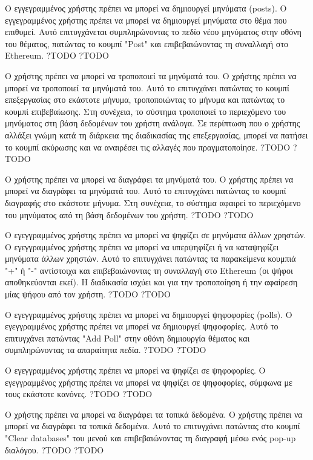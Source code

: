 \begin{enumerate}[label=\textbf{<ΛΑ-\arabic*>}, leftmargin=\parindent, align=left, labelwidth=\parindent, labelsep=0pt]
	\sysReqItem
		{Ο εγγεγραμμένος χρήστης πρέπει να μπορεί να δημιουργεί μηνύματα (posts).}
		{Ο εγγεγραμμένος χρήστης πρέπει να μπορεί να δημιουργεί μηνύματα στο θέμα που επιθυμεί. Αυτό επιτυγχάνεται συμπληρώνοντας το πεδίο νέου μηνύματος στην οθόνη του θέματος, πατώντας το κουμπί "Post" και επιβεβαιώνοντας τη συναλλαγή στο Ethereum.}
		{?}{TODO}
		{?}{TODO}

	\sysReqItem
		{Ο χρήστης πρέπει να μπορεί να τροποποιεί τα μηνύματά του.}
		{Ο χρήστης πρέπει να μπορεί να τροποποιεί τα μηνύματά του. Αυτό το επιτυγχάνει πατώντας το κουμπί επεξεργασίας στο εκάστοτε μήνυμα, τροποποιώντας το μήνυμα και πατώντας το κουμπί επιβεβαίωσης. Στη συνέχεια, το σύστημα τροποποιεί το περιεχόμενο του μηνύματος στη βάση δεδομένων του χρήστη ανάλογα. Σε περίπτωση που ο χρήστης αλλάξει γνώμη κατά τη διάρκεια της διαδικασίας της επεξεργασίας, μπορεί να πατήσει το κουμπί ακύρωσης και να αναιρέσει τις αλλαγές που πραγματοποίησε.}
		{?}{TODO}
		{?}{TODO}

	\sysReqItem
		{Ο χρήστης πρέπει να μπορεί να διαγράφει τα μηνύματά του.}
		{Ο χρήστης πρέπει να μπορεί να διαγράφει τα μηνύματά του. Αυτό το επιτυγχάνει πατώντας το κουμπί διαγραφής στο εκάστοτε μήνυμα. Στη συνέχεια, το σύστημα αφαιρεί το περιεχόμενο του μηνύματος από τη βάση δεδομένων του χρήστη.}
		{?}{TODO}
		{?}{TODO}	

	\sysReqItem
		{Ο εγεγγραμμένος χρήστης πρέπει να μπορεί να ψηφίζει σε μηνύματα άλλων χρηστών.}
		{Ο εγεγγραμμένος χρήστης πρέπει να μπορεί να υπερψηφίζει ή να καταψηφίζει μηνύματα άλλων χρηστών. Αυτό το επιτυγχάνει πατώντας τα παρακείμενα κουμπιά "+" ή "-" αντίστοιχα και επιβεβαιώνοντας τη συναλλαγή στο Ethereum (οι ψήφοι αποθηκεύονται εκεί). Η διαδικασία ισχύει και για την τροποποίηση ή την αφαίρεση μίας ψήφου από τον χρήστη.}
		{?}{TODO}
		{?}{TODO}	

	\sysReqItem
		{Ο εγεγγραμμένος χρήστης πρέπει να μπορεί να δημιουργεί ψηφοφορίες (polls).}
		{Ο εγεγγραμμένος χρήστης πρέπει να μπορεί να δημιουργεί ψηφοφορίες. Αυτό το επιτυγχάνει πατώντας "Add Poll" στην οθόνη δημιουργία θέματος και συμπληρώνοντας τα απαραίτητα πεδία.}
		{?}{TODO}
		{?}{TODO}	

	\sysReqItem
		{Ο εγεγγραμμένος χρήστης πρέπει να μπορεί να ψηφίζει σε ψηφοφορίες.}
		{Ο εγεγγραμμένος χρήστης πρέπει να μπορεί να ψηφίζει σε ψηφοφορίες, σύμφωνα με τους εκάστοτε κανόνες.}
		{?}{TODO}
		{?}{TODO}

	\sysReqItem
		{Ο χρήστης πρέπει να μπορεί να διαγράφει τα τοπικά δεδομένα.}
		{Ο χρήστης πρέπει να μπορεί να διαγράφει τα τοπικά δεδομένα. Αυτό το επιτυγχάνει πατώντας στο κουμπί "Clear databases" του μενού και επιβεβαιώνοντας τη διαγραφή μέσω ενός pop-up διαλόγου.}
		{?}{TODO}
		{?}{TODO}


\end{enumerate}
